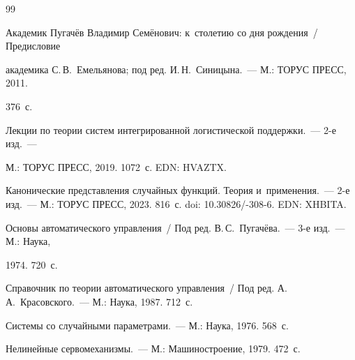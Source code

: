 {{\begin{thebibliography}{99}

Академик Пугачёв Владимир Семёнович: к~столетию со дня рождения~/ Предисловие 

академика С.\,В.~Емельянова; под ред. И.\,Н.~Синицына.~--- М.: ТОРУС ПРЕСС, 2011. 

376~с.










Лекции по тео\-рии сис\-тем интегрированной логистической поддержки.~--- 2-е изд.~--- 

М.: ТОРУС ПРЕСС, 2019. 1072~с. EDN: HVAZTX.






Канонические представления случайных функций. Тео\-рия и~применения.~--- 2-е изд.~--- М.: ТОРУС ПРЕСС, 2023. 816~с. doi: 10.30826\!/-308-6. EDN: XHBITA.







Основы автоматического управления~/ Под ред. В.\,С.~Пугачёва.~--- 3-е изд.~--- М.: Наука, 

1974. 720~с.





Справочник по теории автоматического управления~/ Под ред. А.\, А.~Красовского.~--- М.: Наука, 1987. 712~с.






Системы со случайными параметрами.~--- М.: Наука, 1976. 568~с.








Нелинейные сервомеханизмы.~--- М.: Машиностроение, 1979. 472~с.



     \end{thebibliography}

} }







